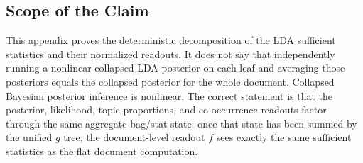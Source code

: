 \subsection{Scope of the Claim}

This appendix proves the deterministic decomposition of the LDA sufficient
statistics and their normalized readouts. It does not say that independently
running a nonlinear collapsed LDA posterior on each leaf and averaging those
posteriors equals the collapsed posterior for the whole document. Collapsed
Bayesian posterior inference is nonlinear. The correct statement is that the
posterior, likelihood, topic proportions, and co-occurrence readouts factor
through the same aggregate bag/stat state; once that state has been summed by
the unified $g$ tree, the document-level readout $f$ sees exactly the same
sufficient statistics as the flat document computation.
